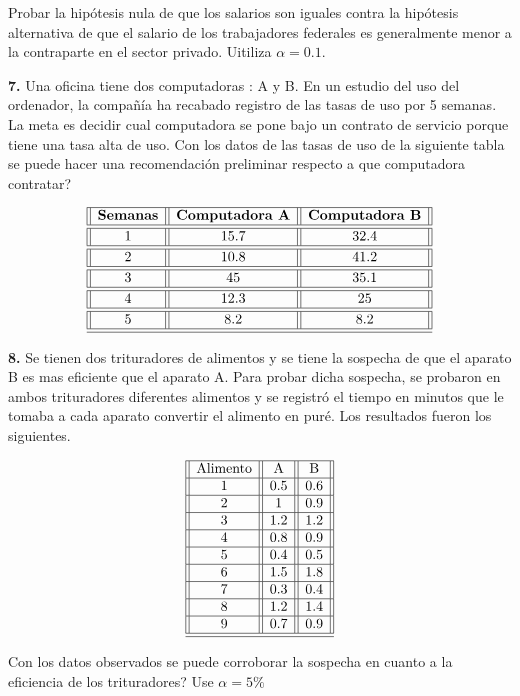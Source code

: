 \documentclass[
  a4paper,
  oneside,
  openany]{book}
\begin{document}
Probar la hipótesis nula de que los salarios son iguales contra la hipótesis alternativa de que el salario de los trabajadores federales es generalmente menor a la contraparte en el sector privado. Uitiliza \(\alpha=0.1\).

\textbf{7.} Una oficina tiene dos computadoras : A y B. En un estudio del uso del ordenador, la compañía ha recabado registro de las tasas de uso por 5 semanas. La meta es decidir cual computadora se pone bajo un contrato de servicio porque tiene una tasa alta de uso. Con los datos de las tasas de uso de la siguiente tabla se puede hacer una recomendación preliminar respecto a que computadora contratar?

\[
\begin{array}{||c| |c| |c||} 
\hline 
\textbf{Semanas} & \textbf{Computadora A} & \textbf{Computadora B} \\ 
\hline
\hline
1 &15.7& 32.4 \\
\hline
\hline
2& 10.8 &41.2 \\
\hline
\hline
3 &45   & 35.1 \\
\hline
\hline
4 &12.3& 25 \\
\hline
\hline
5 & 8.2&8.2 \\
\hline
\hline
\end{array}
\]

\textbf{8.} Se tienen dos trituradores de alimentos y se tiene la sospecha de que el aparato B es mas eficiente que el aparato A. Para probar dicha sospecha, se probaron en ambos trituradores diferentes alimentos y se registró el tiempo en minutos que le tomaba a cada aparato convertir el alimento en puré. Los resultados fueron los siguientes.

\[
\begin{array}{||c| |c| |c| |c|} 
\hline 
\mbox{Alimento} & \mbox{A} & \mbox{B}\\
 \hline
1&0.5&0.6\\
 \hline
2&1&0.9\\
 \hline
3&1.2&1.2\\
 \hline
4&0.8&0.9\\
 \hline
5&0.4&0.5\\
 \hline
6&1.5&1.8\\
 \hline
7&0.3&0.4\\
 \hline
8&1.2&1.4\\
 \hline
9&0.7&0.9\\
\hline
\hline
\end{array}
\]

Con los datos observados se puede corroborar la sospecha en cuanto a la eficiencia de los trituradores? Use \(\alpha=5\%\)
\end{document}

